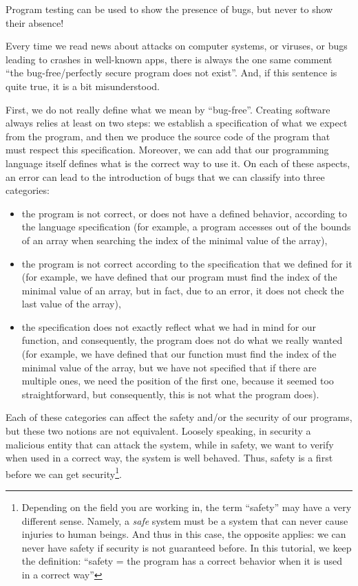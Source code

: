 \begin{Quotation}[Dijkstra]
Program testing can be used to show the presence of bugs, but never to show
their absence!
\end{Quotation}




Every time we read news about attacks on computer systems, or
viruses, or bugs leading to crashes in well-known apps, there is always
the one same comment ``the bug-free/perfectly secure program does not
exist''. And, if this sentence is quite true, it is a bit misunderstood.


First, we do not really define what we mean by ``bug-free''. Creating
software always relies at least on two steps: we establish a specification
of what we expect from the program, and then we produce the source code of
the program that must respect this specification. Moreover, we can add that
our programming language itself defines what is the correct way to use it.
On each of these aspects, an error can lead to the introduction of bugs that
we can classify into three categories:
\begin{itemize}
\item the program is not correct, or does not have a defined behavior,
      according to the language specification (for example, a program
      accesses out of the bounds of an array when searching the index of
      the minimal value of the array),
\item the program is not correct according to the specification that we
      defined for it (for example, we have defined that our program must
      find the index of the minimal value of an array, but in fact, due to
      an error, it does not check the last value of the array),
\item the specification does not exactly reflect what we had in mind for
      our function, and consequently, the program does not do what we really
      wanted (for example, we have defined that our function must find the
      index of the minimal value of the array, but we have not specified that
      if there are multiple ones, we need the position of the first one,
      because it seemed too straightforward, but consequently, this is not
      what the program does).
\end{itemize}


Each of these categories can affect the safety and/or the security of our
programs, but these two notions are not equivalent. Loosely speaking,
in security a malicious entity that can attack the system, while in safety, we
want to verify when used in a correct way, the system is well behaved. Thus, safety
is a first before we can get security\footnote{Depending on the field you are
  working in, the term ``safety'' may have a very different sense. Namely, a
  \textit{safe} system must be a system that can never cause injuries to human
  beings. And thus in this case, the opposite applies: we can never have safety
  if security is not guaranteed before. In this tutorial, we keep the definition:
  ``safety = the program has a correct behavior when it is used in a correct way''}.


